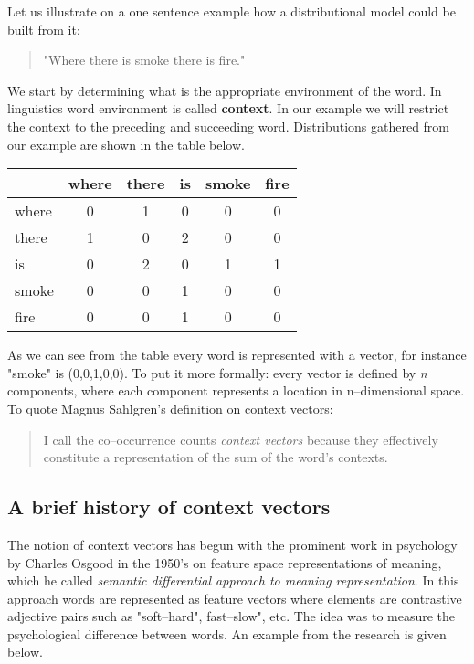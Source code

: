 Let us illustrate on a one sentence example how a distributional model could be built from it: 
\begin{quotation}
"Where there is smoke there is fire."
\end{quotation}
We start by determining what is the appropriate environment of the word. In linguistics word environment is called \textbf{context}. In our example we will restrict the context to the preceding and succeeding word. Distributions gathered from our example are shown in the table below. 
\\
\begin{center}
\begin{tabular}{ l | c c c c c }
   &  where & there & is & smoke & fire\\
  \hline                       
  where & 0 & 1 & 0 & 0 & 0 \\
  there & 1 & 0 & 2 &  0 & 0 \\
  is & 0 & 2 & 0 & 1 & 1 \\
  smoke & 0 & 0 & 1 & 0 & 0 \\
  fire & 0 & 0 & 1 & 0 & 0 \\
\end{tabular}
\end{center}
As we can see from the table every word is represented with a vector, for instance "smoke" is (0,0,1,0,0). To put it more formally: every vector is defined by \textit{n} components, where each component represents a location in n--dimensional space. To quote Magnus Sahlgren's definition on context vectors:
\begin{quotation}
I call the co--occurrence counts \textit{context vectors} because they effectively constitute a representation of the sum of the word's contexts.
\end{quotation} 

\subsection{A brief history of context vectors}
The notion of context vectors has begun with the prominent work in psychology by Charles Osgood in the 1950's\cite{osgood1952} on feature space representations of meaning, which he called \textit{semantic differential approach to meaning representation}. In this approach words are represented as feature vectors where elements are contrastive adjective pairs such as "soft--hard", fast--slow", etc. The idea was to measure the psychological difference between words. An example from the research is given below. 

